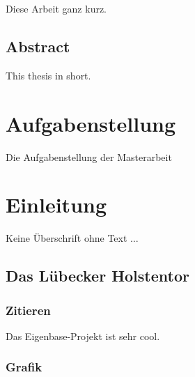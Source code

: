 \documentclass[
	ngerman,
	11pt,
	twoside,
	a4paper,
	headsepline,
	footsepline, 
	toc=bib
]{scrbook}
\begin{document}
Diese Arbeit ganz kurz.

%
\vskip 3cm
%

\section*{\huge Abstract}

This thesis in short.

\thispagestyle{empty}
\cleardoublepage


\chapter*{Aufgabenstellung}

Die Aufgabenstellung der Masterarbeit


	\thispagestyle{empty}
	\cleardoublepage

	\mainmatter


\chapter{Einleitung}
\label{cha:einleitung}

Keine Überschrift ohne Text $\dots$

\section{Das Lübecker Holstentor}
\label{sec:holstentor}

\subsection{Zitieren}
\label{sec:cite}

Das Eigenbase-Projekt \cite{Akyildiz2008a} ist sehr cool.

\subsection{Grafik}
\end{document}
